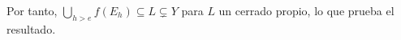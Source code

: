 \documentclass[twoside]{article}
\begin{document}
\begin{solucion}
\begin{enumerate}[(a)]
Por tanto, $\bigcup_{h>e}f(E_h)\subseteq L\subsetneq Y$ para $L$ un cerrado propio, lo que prueba el resultado. 


\end{enumerate}
%
%
%




\end{solucion}
\end{document}
